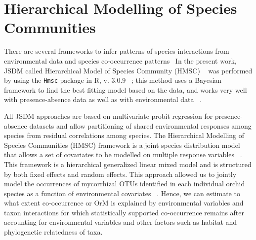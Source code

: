 \chapter{Hierarchical Modelling of Species Communities}
\label{hierarchicalmodellingofspeciescommunities}

There are several frameworks to infer patterns of species interactions from environmental data and species co-occurrence patterns~\citep{pollock2014, warton2015}
In the present work, JSDM called Hierarchical Model of Species Community (HMSC) ~\citep{ovaskainen2017} was performed by using the \texttt{Hmsc} package in R, v. 3.0.9 ~\citep{tikhonov2020, hmsc-r2021}; this method uses a Bayesian framework to find the best fitting model based on the data, and works very well with presence-absence data as well as with environmental data ~\citep{hefley2016}.

All JSDM approaches are based on multivariate probit regression for presence-absence datasets and allow partitioning of shared environmental responses among species from residual correlations among species. The Hierarchical Modelling of Species Communities (HMSC) framework is a joint species distribution model that allows a set of covariates to be modelled on multiple response variables ~\citep{ovaskainen2017}. This framework is a hierarchical generalized linear mixed model and is structured by both fixed effects and random effects. This approach allowed us to jointly model the occurrences of mycorrhizal OTUs identified in each individual orchid species as a function of environmental covariates ~\citep{tikhonov2017}. Hence, we can estimate to what extent co-occurrence or OrM is explained by environmental variables and taxon interactions for which statistically supported co-occurrence remains after accounting for environmental variables and other factors such as habitat and phylogenetic relatedness of taxa.

